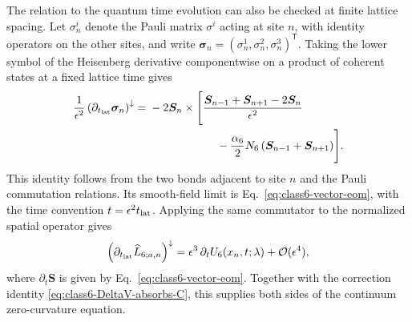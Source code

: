 The relation to the quantum time evolution can also be checked at
finite lattice spacing.  Let $\sigma_n^i$ denote the Pauli matrix
$\sigma^i$ acting at site $n$, with identity operators on the other
sites, and write
$\boldsymbol\sigma_n=(\sigma_n^1,\sigma_n^2,\sigma_n^3)^{\mathsf T}$.
Taking the lower symbol of the Heisenberg derivative componentwise on
a product of coherent states at a fixed lattice time gives
\begin{align}
\frac{1}{\epsilon^2}
\left(\partial_{t_{\rm lat}}\boldsymbol\sigma_n\right)^\downarrow
={}&-2\boldsymbol S_n\times\Biggl[
\frac{\boldsymbol S_{n-1}+\boldsymbol S_{n+1}-2\boldsymbol S_n}
{\epsilon^2}
\nonumber\\
&\hspace{6em}
-\frac{\alpha_6}{2}N_6
\left(\boldsymbol S_{n-1}+\boldsymbol S_{n+1}\right)
\Biggr].
\label{eq:class6-finite-lattice-spin-flow}
\end{align}
This identity follows from the two bonds adjacent to site $n$ and the
Pauli commutation relations.  Its smooth-field limit is
Eq.~\eqref{eq:class6-vector-eom}, with the time convention
$t=\epsilon^2t_{\rm lat}$.  Applying the same commutator to the
normalized spatial operator gives
\begin{equation}
\left(\partial_{t_{\rm lat}}\widehat L_{6;a,n}\right)^\downarrow
=\epsilon^3\,\partial_tU_6(x_n,t;\lambda)
+\mathcal O(\epsilon^4),
\label{eq:class6-heisenberg-to-Ut}
\end{equation}
where $\partial_t\boldsymbol S$ is given by
Eq.~\eqref{eq:class6-vector-eom}.
Together with the correction identity
\eqref{eq:class6-DeltaV-absorbs-C}, this supplies both sides of the
continuum zero-curvature equation.

